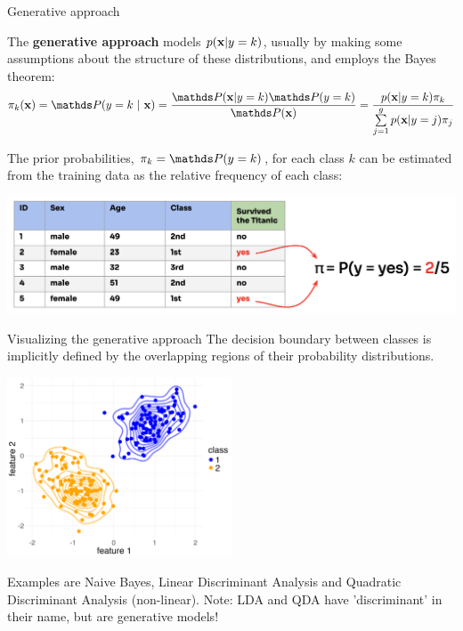 \documentclass[11pt,compress,t,notes=noshow, xcolor=table]{beamer}
\begin{document}
\begin{vbframe}{Generative approach}

The \textbf{generative approach}
models $p(\mathbf{x} | y= k)$, usually by making some assumptions about the structure of these distributions, and employs the Bayes theorem:
$$\pikx = \postk = \frac{\P(\xv | y = k) \P(y = k)}{\P(\xv)} = \frac{\pdfxyk \pik}{\sumjg \pdfxyk[j] \pi_j}$$

The prior probabilities, $\pi_k = \P(y = k)$, for each class $k$ can be estimated from the training data as the relative frequency of each class:

\begin{center}
\includegraphics{figure_man/prior_probabilities.png} 
\end{center}

\end{vbframe}

\begin{vbframe}{Visualizing the generative approach}
The decision boundary between classes is implicitly defined by the overlapping regions of their probability distributions.

\begin{center}
\includegraphics[width=0.5\textwidth]{figure/approach_generative.png} 
\end{center}

\small{
Examples are Naive Bayes, Linear Discriminant Analysis and Quadratic Discriminant Analysis (non-linear). Note: LDA and QDA have 'discriminant' in their name, but are generative models!}
\end{vbframe}
\end{document}
